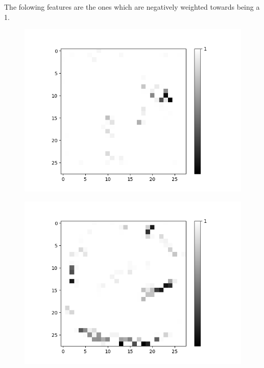 The folowing features are the ones which are negatively weighted towards being a 1. 
\begin{figure}[H]
	\captionsetup{labelformat=empty}
	\centering
	\begin{minipage}[b]{0.19\textwidth}
		\includegraphics[width=\textwidth]{OR-AND(W-LSM)(1)/DontLike/True/Layer0-Neuron-2.png}
		\label{}
	\end{minipage}
	\begin{minipage}[b]{0.19\textwidth}
		\includegraphics[width=\textwidth]{OR-AND(W-LSM)(1)/DontLike/True/Layer0-Neuron-9.png}
		\label{}
	\end{minipage}
	\begin{minipage}[b]{0.19\textwidth}

\end{minipage}
\end{figure}
